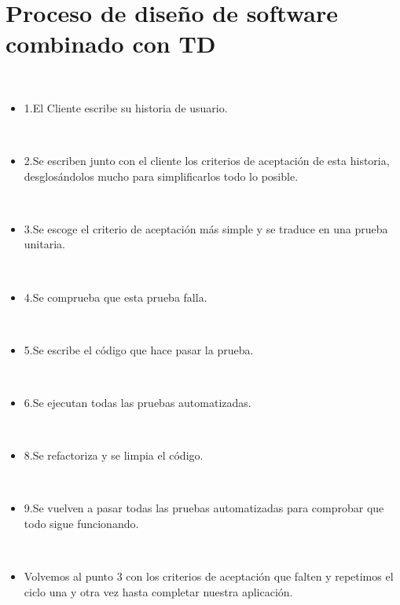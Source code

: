 \section{Proceso de diseño de software combinado con TD} 
\textbf{}\\
\begin{flushleft}


\begin{itemize}


\item 1.El Cliente escribe su historia de usuario.

\textbf{}\\
\item 2.Se escriben junto con el cliente los criterios de aceptación de esta historia, desglosándolos mucho para simplificarlos todo lo posible.


\textbf{}\\
\item 3.Se escoge el criterio de aceptación más simple y se traduce en una prueba unitaria.

\textbf{}\\

\item 4.Se comprueba que esta prueba falla.

\textbf{}\\

\item 5.Se escribe el código que hace pasar la prueba.

\textbf{}\\

\item 6.Se ejecutan todas las pruebas automatizadas.

\textbf{}\\

\item 8.Se refactoriza y se limpia el código.

\textbf{}\\

\item 9.Se vuelven a pasar todas las pruebas automatizadas para comprobar que todo sigue funcionando.

\textbf{}\\

\item Volvemos al punto 3 con los criterios de aceptación que falten y repetimos el ciclo una y otra vez hasta completar nuestra aplicación.

	


\end{itemize} 


\end{flushleft}
